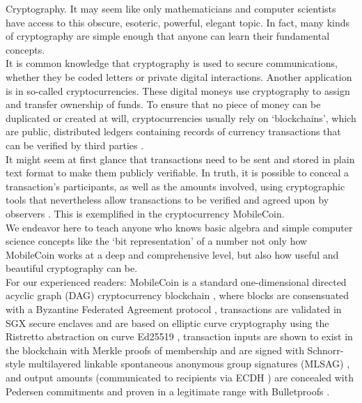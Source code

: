

Cryptography. It may seem like only mathematicians and computer scientists have access to this obscure, esoteric, powerful, elegant topic. In fact, many kinds of cryptography are simple enough that anyone can learn their fundamental concepts.
\\ \newline
It is common knowledge that cryptography is used to secure communications, whether they be coded letters or private digital interactions. Another application is in so-called cryptocurrencies. These digital moneys use cryptography to assign and transfer ownership of funds. To ensure that no piece of money can be duplicated or created at will, cryptocurrencies usually rely on `blockchains', which are public, distributed ledgers containing records of currency transactions that can be verified by third parties \cite{Nakamoto_bitcoin}.
\\ \newline
It might seem at first glance that transactions need to be sent and stored in plain text format to make them publicly verifiable. In truth, it is possible to conceal a transaction's participants, as well as the amounts involved, using cryptographic tools that nevertheless allow transactions to be verified and agreed upon by observers \cite{cryptoNoteWhitePaper}. This is exemplified in the cryptocurrency MobileCoin.
\\ \newline
We endeavor here to teach anyone who knows basic algebra and simple computer science concepts like the `bit representation' of a number not only how MobileCoin works at a deep and comprehensive level, but also how useful and beautiful cryptography can be.
\\ \newline
For our experienced readers: MobileCoin is a standard one-dimensional directed acyclic graph (DAG) cryptocurrency blockchain \cite{Nakamoto_bitcoin}, where blocks are consensuated with a Byzantine Federated Agreement protocol \cite{stellar-consensus-protocol}, transactions are validated in SGX secure enclaves \cite{intel-sgx-explained-advanced} and are based on elliptic curve cryptography using the Ristretto abstraction \cite{ristretto} on curve Ed25519 \cite{Bernstein2012-high-speed-high-security-ed25519}, transaction inputs are shown to exist in the blockchain with Merkle proofs of membership \cite{merkle-tree} and are signed with Schnorr-style multilayered linkable spontaneous anonymous group signatures (MLSAG) \cite{MRL-0005-ringct}, and output amounts (communicated to recipients via ECDH \cite{Diffie-Hellman}) are concealed with Pedersen commitments \cite{maxwell-ct-2} and proven in a legitimate range with Bulletproofs \cite{Bulletproofs_paper}. %